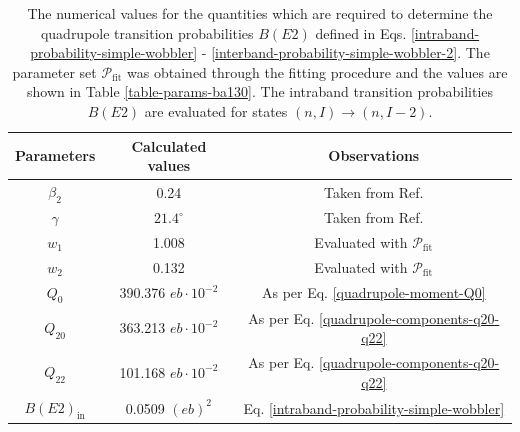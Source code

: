 \begin{table}
    \centering
    \begin{tabular}{|c|c|c|}
    \hline
    Parameters & Calculated values & Observations                                               \\ \hline
    $\beta_2$  & 0.24              & Taken from Ref. \cite{chen2019transverse}                 \\ \hline
    $\gamma$   & $21.4^\circ$      & Taken from Ref. \cite{chen2019transverse}                 \\ \hline
    $w_1$      & 1.008             & Evaluated with $\mathcal{P}_\text{fit}$                    \\ \hline
    $w_2$      & 0.132             & Evaluated with $\mathcal{P}_\text{fit}$                    \\ \hline
    $Q_0$      & 390.376 $eb\cdot10^{-2}$      & As per Eq. \ref{quadrupole-moment-Q0}                                                           \\ \hline
    $Q_{20}$   & 363.213 $eb\cdot10^{-2}$          & As per Eq. \ref{quadrupole-components-q20-q22}                                                            \\ \hline
    $Q_{22}$   & 101.168 $eb\cdot10^{-2}$           & As per Eq. \ref{quadrupole-components-q20-q22}                                                            \\ \hline
    $B(E2)_\text{in}$ &        0.0509 $(eb)^2$          & Eq. \ref{intraband-probability-simple-wobbler}              \\ \hline
    \end{tabular}%
    \caption{The numerical values for the quantities which are required to determine the quadrupole transition probabilities $B(E2)$ defined in Eqs. \ref{intraband-probability-simple-wobbler} - \ref{interband-probability-simple-wobbler-2}. The parameter set $\mathcal{P}_\text{fit}$ was obtained through the fitting procedure and the values are shown in Table \ref{table-params-ba130}. The intraband transition probabilities $B(E2)$ are evaluated for states $(n,I)\to(n,I-2)$.}
    \label{transition-parameters-ba130}
\end{table}

